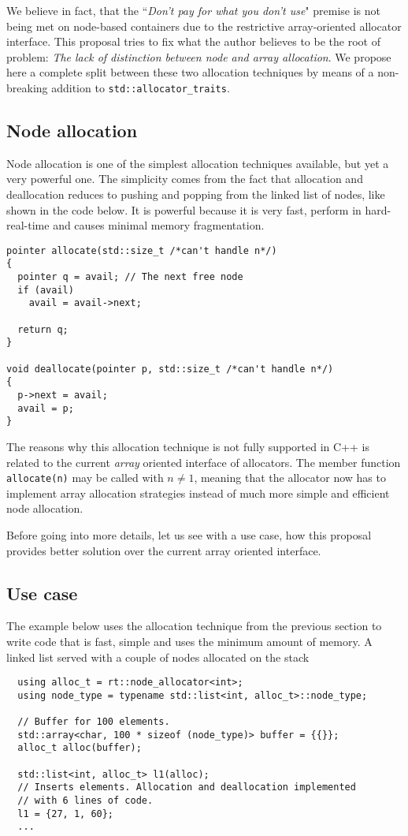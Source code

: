 \documentclass[11pt]{article}
\begin{document}
We believe in fact, that the ``{\it Don't pay for what you don't use}" premise
is not being met on node-based containers due to the restrictive
array-oriented allocator interface. This proposal tries to fix what the author
believes to be the root of problem: {\it The lack of distinction between node
and array allocation}.  We propose here a complete split between these two
allocation techniques by means of a non-breaking addition to
\texttt{std::allocator\_traits}.

\subsection{Node allocation}
Node allocation is one of the simplest allocation techniques
available, but yet a very powerful one. The simplicity
comes from the fact that allocation and deallocation reduces to pushing and
popping from the linked list of nodes, like shown in the code below.
It is powerful because it is very fast, perform in hard-real-time
and causes minimal memory fragmentation.
\begin{lstlisting}
pointer allocate(std::size_t /*can't handle n*/)
{
  pointer q = avail; // The next free node
  if (avail)
    avail = avail->next;

  return q;
}

void deallocate(pointer p, std::size_t /*can't handle n*/)
{
  p->next = avail;
  avail = p;
}

\end{lstlisting}

The reasons why this allocation technique is not fully supported in C++ is
related to the current {\it array} oriented interface of allocators.  The
member function \texttt{allocate(n)} may be called with $n \ne 1$, meaning that
the allocator now has to implement array allocation strategies instead of much
more simple and efficient node allocation.

Before going into more details, let us see with a use case,
how this proposal provides better solution over the current
array oriented interface.

\subsection{Use case}
The example below uses the allocation technique from the previous section to
write code that is fast, simple and uses the minimum amount of memory. A linked
list served with a couple of nodes allocated on the stack
\begin{lstlisting}
  using alloc_t = rt::node_allocator<int>;
  using node_type = typename std::list<int, alloc_t>::node_type;

  // Buffer for 100 elements.
  std::array<char, 100 * sizeof (node_type)> buffer = {{}};
  alloc_t alloc(buffer);

  std::list<int, alloc_t> l1(alloc);
  // Inserts elements. Allocation and deallocation implemented
  // with 6 lines of code.
  l1 = {27, 1, 60};
  ...
\end{lstlisting}
\end{document}
